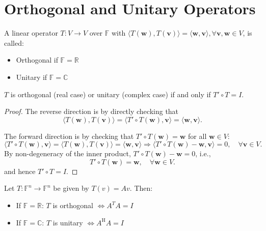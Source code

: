 \section{Orthogonal and Unitary Operators}

\begin{definition}
A linear operator \(T : V \rightarrow V\) over \(\mathbb{F}\) with \(\langle T(\mathbf{w}),T(\mathbf{v}) \rangle = \langle \mathbf{w},\mathbf{v}\rangle, \forall \mathbf{v},\mathbf{w} \in V\), is called:
\begin{itemize}
  \item Orthogonal if \(\mathbb{F} = \mathbb{R}\)
  \item Unitary if \(\mathbb{F} = \mathbb{C}\)
\end{itemize}
\end{definition}

\begin{proposition}\label{prop:orthogonal-unitary}
\( T \) is orthogonal (real case) or unitary (complex case) if and only if \( T' \circ T = I \).
\end{proposition}

\begin{proof}
The reverse direction is by directly checking that
\[
\langle T(\mathbf{w}), T(\mathbf{v}) \rangle 
= \langle T' \circ T(\mathbf{w}), \mathbf{v} \rangle 
= \langle \mathbf{w}, \mathbf{v} \rangle.
\]

The forward direction is by checking that \( T' \circ T(\mathbf{w}) = \mathbf{w} \) for all \( \mathbf{w} \in V \):
\[
\langle T' \circ T(\mathbf{w}), \mathbf{v} \rangle 
= \langle T(\mathbf{w}), T(\mathbf{v}) \rangle 
= \langle \mathbf{w}, \mathbf{v} \rangle 
\Rightarrow 
\langle T' \circ T(\mathbf{w}) - \mathbf{w}, \mathbf{v} \rangle = 0, \quad \forall \mathbf{v} \in V.
\]
By non-degeneracy of the inner product, \( T' \circ T(\mathbf{w}) - \mathbf{w} = 0 \), i.e.,
\[
T' \circ T(\mathbf{w}) = \mathbf{w}, \quad \forall \mathbf{w} \in V.
\]
and hence $T' \circ T = I$.
\end{proof}

\begin{example}
Let \(T : \mathbb{F}^n \rightarrow \mathbb{F}^n\) be given by \(T(v) = Av\). Then:
\begin{itemize}
  \item If \(\mathbb{F} = \mathbb{R}\): \(T\) is orthogonal \(\Leftrightarrow A^T A = I\)
  \item If \(\mathbb{F} = \mathbb{C}\): \(T\) is unitary \(\Leftrightarrow A^{\mathrm{H}} A = I\)
\end{itemize}
\end{example}

